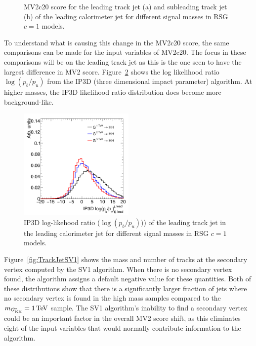 \begin{figure}[h!]
   \caption{MV2c20 score for the leading track jet (a) and subleading track jet (b) of the leading calorimeter jet for different signal masses in RSG $c=1$ models.}
  \label{fig:TrackJetMV2}
\end{figure}

To understand what is causing this change in the MV2c20 score, the same comparisons can be made for the input variables of MV2c20. The focus in these comparisons will be on the leading track jet as this is the one seen to have the largest difference in MV2 score. Figure~\ref{fig:TrackJetIP3D} shows the log likelihood ratio $\log(p_b/p_u)$ from the IP3D (three dimensional impact parameter) algorithm. At higher masses, the IP3D likelihood ratio distribution does become more background-like. 

\begin{figure}[h!]
  \centering
  \captionsetup{justification=centering}

  \includegraphics[width=0.5\textwidth]{figures/LeadTrackJet_IP3D}
  \caption{IP3D log-likehood ratio ($\log(p_b/p_u))$) of the leading track jet in the leading calorimeter jet for different signal masses in RSG $c=1$ models.}
  \label{fig:TrackJetIP3D}
\end{figure}
%
Figure~\ref{fig:TrackJetSV1} shows the mass and number of tracks at the secondary vertex computed by the SV1 algorithm. When there is no secondary vertex found, the algorithm assigns a default negative value for these quantities. Both of these distributions show that there is a significantly larger fraction of jets where no secondary vertex is found in the high mass samples compared to the $m_{\Gkk} = 1 \TeV$ sample. The SV1 algorithm's inability to find a secondary vertex could be an important factor in the overall MV2 score shift, as this eliminates eight of the input variables that would normally contribute information to the algorithm. 

